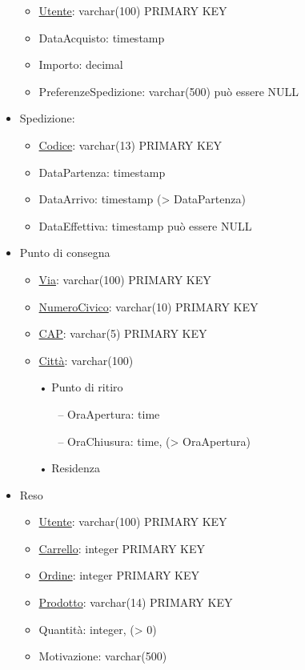 \documentclass[11pt]{article}
\begin{document}
\begin{itemize}
\begin{itemize}
        \item \underline{Utente}: varchar(100) PRIMARY KEY
        \item DataAcquisto: timestamp
        \item Importo: decimal
        \item PreferenzeSpedizione: varchar(500) può essere NULL
    \end{itemize}
    \item Spedizione:
    \begin{itemize}
        \item \underline{Codice}: varchar(13) PRIMARY KEY
        \item DataPartenza: timestamp
        \item DataArrivo: timestamp (\textgreater{} DataPartenza)
        \item DataEffettiva: timestamp può essere NULL
    \end{itemize}
    \item Punto di consegna
    \begin{itemize}
        \item \underline{Via}: varchar(100) PRIMARY KEY
        \item \underline{NumeroCivico}: varchar(10) PRIMARY KEY
        \item \underline{CAP}: varchar(5) PRIMARY KEY
        \item \underline{Città}: varchar(100)
        \item[•] Punto di ritiro
        \begin{itemize}
            \item[–] OraApertura: time
            \item[–] OraChiusura: time, (\textgreater{} OraApertura)
        \end{itemize}
        \item[•] Residenza
    \end{itemize}
    \item Reso
    \begin{itemize}
        \item \underline{Utente}: varchar(100) PRIMARY KEY
        \item \underline{Carrello}: integer PRIMARY KEY
        \item \underline{Ordine}: integer PRIMARY KEY
        \item \underline{Prodotto}: varchar(14) PRIMARY KEY
        \item Quantità: integer, (\textgreater{} 0)
        \item Motivazione: varchar(500)
    \end{itemize}
\end{itemize}
\end{document}
